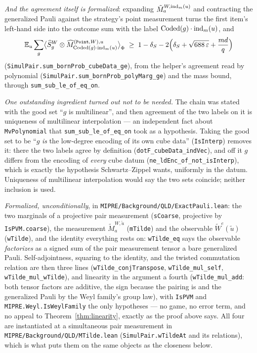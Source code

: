 \emph{And the agreement itself is formalized}: expanding $\tilde{M}^{W,\mathrm{ind}_m(u)}_a$ and
contracting the generalized Pauli against the strategy's point measurement turns the first item's
left-hand side into the outcome sum with the label $\mathrm{Coded}(g) \cdot \mathrm{ind}_m(u)$, and
\begin{equation*}
  \mathbb E_u \sum_g \bigl\langle \widehat S^W_g \otimes
    \widehat M^{(\mathtt{Point}, W), u}_{\mathrm{Coded}(g) \cdot \mathrm{ind}_m(u)} \bigr\rangle_\Phi
  \;\geq\; 1 - \delta_S - 2\Bigl( \delta_S + \sqrt{688\,\varepsilon} + \frac{md}{q} \Bigr)
\end{equation*}
(\texttt{SimulPair.sum\_bornProb\_cubeData\_ge}), from the helper's agreement read by polynomial
(\texttt{SimulPair.sum\_bornProb\_polyMarg\_ge}) and the mass bound, through
\texttt{sum\_sub\_le\_of\_eq\_on}.

\emph{One outstanding ingredient turned out not to be needed.} The chain was stated with the good
set ``$g$ is multilinear'', and then agreement of the two labels on it is uniqueness of multilinear
interpolation --- an independent fact about \texttt{MvPolynomial} that
\texttt{sum\_sub\_le\_of\_eq\_on} took as a hypothesis. Taking the good set to be ``$g$
\emph{is} the low-degree encoding of its own cube data'' (\texttt{IsInterp}) removes it: there the
two labels agree by definition (\texttt{dotF\_cubeData\_indVec}), and off it $g$ differs from the
encoding of \emph{every} cube datum (\texttt{ne\_ldEnc\_of\_not\_isInterp}), which is exactly
the hypothesis Schwartz--Zippel wants, uniformly in the datum. Uniqueness of multilinear
interpolation would say the two sets coincide; neither inclusion is used.

\emph{Formalized, unconditionally}, in \texttt{MIPRE/Background/QLD/ExactPauli.lean}: the two
marginals of a projective pair measurement (\texttt{sCoarse}, projective by
\texttt{IsPVM.coarse}), the measurement $\tilde{M}^{W,\tilde{u}}_a$ (\texttt{mTilde}) and the
observable $\tilde{W}^e(\tilde{u})$ (\texttt{wTilde}), and the identity everything rests on:
\texttt{wTilde\_eq} says the observable \emph{factorizes} as a signed sum of the pair measurement
tensor a bare generalized Pauli. Self-adjointness, squaring to the identity, and the twisted
commutation relation are then three lines
(\texttt{wTilde\_conjTranspose}, \texttt{wTilde\_mul\_self}, \texttt{wTilde\_mul\_wTilde}), and
linearity in the argument a fourth (\texttt{wTilde\_mul\_add}: both tensor factors are additive,
the sign because the pairing is and the generalized Pauli by the Weyl family's group law), with
\texttt{IsPVM} and \texttt{MIPRE.Weyl.IsWeylFamily} the only hypotheses --- no game, no error term,
and no appeal to Theorem~\ref{thm:linearity}, exactly as the proof above says. All four are
instantiated at a simultaneous pair measurement in \texttt{MIPRE/Background/QLD/MTilde.lean}
(\texttt{SimulPair.wTildeAt} and its relations), which is what puts them on the same objects as
the closeness below.


